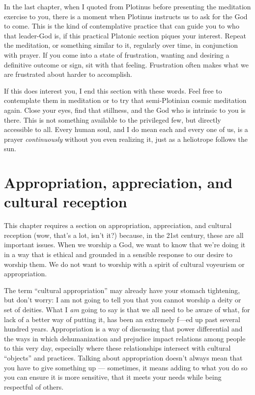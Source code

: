 \documentclass[
]{book}
\begin{document}
In the last chapter, when I quoted from Plotinus before presenting the meditation exercise to you, there is a moment when Plotinus instructs us to ask for the God to come. This is the kind of contemplative practice that can guide you to who that leader-God is, if this practical Platonic section piques your interest. Repeat the meditation, or something similar to it, regularly over time, in conjunction with prayer. If you come into a state of frustration, wanting and desiring a definitive outcome or sign, sit with that feeling. Frustration often makes what we are frustrated about harder to accomplish.

If this does interest you, I end this section with these words. Feel free to contemplate them in meditation or to try that semi-Plotinian cosmic meditation again. Close your eyes, find that stillness, and the God who is intrinsic to you is there. This is not something available to the privileged few, but directly accessible to all. Every human soul, and I do mean each and every one of us, is a prayer \emph{continuously} without you even realizing it, just as a heliotrope follows the sun.

\hypertarget{appropriation-appreciation-and-cultural-reception}{%
\section{Appropriation, appreciation, and cultural reception}\label{appropriation-appreciation-and-cultural-reception}}

This chapter requires a section on appropriation, appreciation, and cultural reception (wow, that's a lot, isn't it?) because, in the 21st century, these are all important issues. When we worship a God, we want to know that we're doing it in a way that is ethical and grounded in a sensible response to our desire to worship them. We do not want to worship with a spirit of cultural voyeurism or appropriation.

The term ``cultural appropriation'' may already have your stomach tightening, but don't worry: I am not going to tell you that you cannot worship a deity or set of deities. What I \emph{am} going to say is that we all need to be aware of what, for lack of a better way of putting it, has been an extremely f---ed up past several hundred years. Appropriation is a way of discussing that power differential and the ways in which dehumanization and prejudice impact relations among people to this very day, especially where these relationships intersect with cultural ``objects'' and practices. Talking about appropriation doesn't always mean that you have to give something up --- sometimes, it means adding to what you do so you can ensure it is more sensitive, that it meets your needs while being respectful of others.
\end{document}
